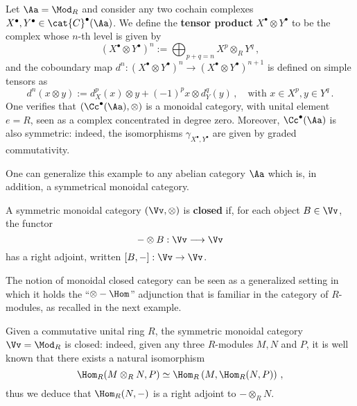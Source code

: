 \begin{ex!}\label{tensor-complex}
    Let $\Aa=\Mod_{R}$ and 
    consider any two cochain complexes $X^{\bullet}, Y^{\bullet} 
    \in \cat{C}^{\bullet}(\Aa)$.
    We define the \textbf{tensor product} $X^{\bullet} \otimes Y^{\bullet}$
    to be the complex whose $n$-th level is given by
        \begin{equation*}
            \left( X^{\bullet} \otimes Y^{\bullet} \right)^{n}
            := \bigoplus_{p+q=n} X^{p} \otimes_{R} Y^{q}\,,
        \end{equation*}
    and the coboundary map $d^{n}:\left( X^{\bullet} \otimes Y^{\bullet} \right)^{n}
    \to \left( X^{\bullet} \otimes Y^{\bullet} \right)^{n+1}$
    is defined on simple tensors as
    \begin{equation*}
        d^{n}(x \otimes y) := d_{X}^{p}(x) \otimes y + (-1)^{p}x \otimes d_{Y}^{q}(y)\,,
        \quad \text{with } x \in X^{p}, y \in Y^{q}\,.
    \end{equation*}
    One verifies that $(\Cc^{\bullet}(\Aa), \otimes)$ is a monoidal category,
    with unital element $e=R$, seen as a complex concentrated in degree zero.
    Moreover, $\Cc^{\bullet}(\Aa)$ is also symmetric:
    indeed, the isomorphisms $\gamma_{X^{\bullet},Y^{\bullet}}$
    are given by graded commutativity.
    
    One can generalize this example to any abelian category $\Aa$
    which is, in addition, a symmetrical monoidal category.
\end{ex!}

\begin{df}
    A symmetric monoidal category $(\Vv, \otimes)$ is \textbf{closed} if,
    for each object $B \in \Vv$, the functor
    \begin{equation*}
        - \otimes B: \Vv \longrightarrow \Vv
    \end{equation*}
    has a right adjoint, written $[B,-] : \Vv \to \Vv$.
\end{df}

\begin{rmk}
    The notion of monoidal closed category can be seen as
    a generalized setting in which it holds the ``$\otimes - \Hom$''
    adjunction that is familiar in the category of $R$-modules,
    as recalled in the next example.
\end{rmk}

\begin{ex}
    Given a commutative unital ring $R$, 
    the symmetric monoidal category $\Vv = \Mod_{R}$
    is closed: indeed, given any three $R$-modules $M,N$ and $P$, 
    it is well known that there exists a natural isomorphism
    \begin{equation*}
        \Hom_{R}(M \otimes_{R} N, P) \simeq \Hom_{R}\left(M, \Hom_{R}(N,P)\right)\,,
    \end{equation*}
    thus we deduce that $\Hom_{R}(N,-)$ is a right adjoint to $-\otimes_{R} N$.
\end{ex}



